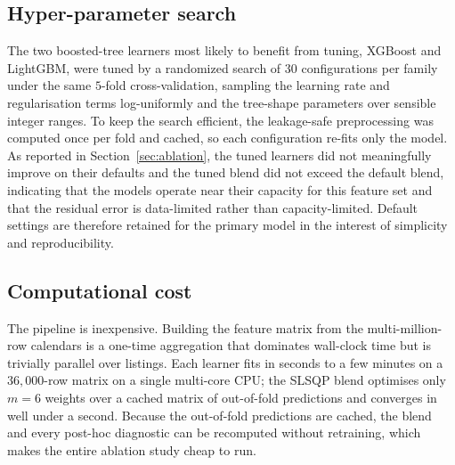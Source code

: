 \documentclass[journal]{IEEEtran}
\begin{document}
\subsection{Hyper-parameter search}
\label{sec:hpsearch}
The two boosted-tree learners most likely to benefit from tuning, XGBoost and
LightGBM, were tuned by a randomized search of $30$ configurations per family
under the same $5$-fold cross-validation, sampling the learning rate and
regularisation terms log-uniformly and the tree-shape parameters over sensible
integer ranges. To keep the search efficient, the leakage-safe preprocessing was
computed once per fold and cached, so each configuration re-fits only the model.
As reported in Section~\ref{sec:ablation}, the tuned learners did not
meaningfully improve on their defaults and the tuned blend did not exceed the
default blend, indicating that the models operate near their capacity for this
feature set and that the residual error is data-limited rather than
capacity-limited. Default settings are therefore retained for the primary model in
the interest of simplicity and reproducibility.

\subsection{Computational cost}
The pipeline is inexpensive. Building the feature matrix from the multi-million-row
calendars is a one-time aggregation that dominates wall-clock time but is trivially
parallel over listings. Each learner fits in seconds to a few minutes on a
$36{,}000$-row matrix on a single multi-core CPU; the SLSQP blend optimises only
$m=6$ weights over a cached matrix of out-of-fold predictions and converges in well
under a second. Because the out-of-fold predictions are cached, the blend and every
post-hoc diagnostic can be recomputed without retraining, which makes the entire
ablation study cheap to run.
\end{document}
